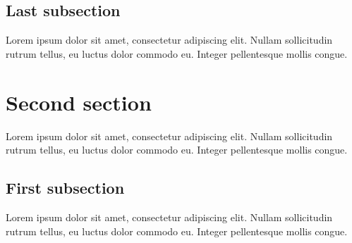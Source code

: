 \subsection{Last subsection}
Lorem ipsum dolor sit amet, consectetur adipiscing elit. Nullam sollicitudin rutrum tellus, 
eu luctus dolor commodo eu. Integer pellentesque mollis congue.

\section{Second section}
Lorem ipsum dolor sit amet, consectetur adipiscing elit. Nullam sollicitudin rutrum tellus, 
eu luctus dolor commodo eu. Integer pellentesque mollis congue.

\subsection{First subsection}
Lorem ipsum dolor sit amet, consectetur adipiscing elit. Nullam sollicitudin rutrum tellus, 
eu luctus dolor commodo eu. Integer pellentesque mollis congue.

​